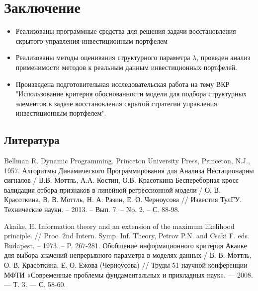 \documentclass[11pt]{beamer}
\begin{document}
\section{Заключение}
\begin{frame}
\begin{itemize}
\item Реализованы программные средства для решения задачи восстановления  скрытого управления инвестиционным портфелем
\item Реализованы методы оценивания структурного параметра $\lambda$, проведен анализ применимости методов к реальным данным инвестиционных портфелей.
\item Произведена подготовительная исследовательская работа на тему ВКР "Использование критерия обоснованности модели для подбора структурных элементов в задаче восстановления скрытой стратегии управления инвестиционным портфелем".
\end{itemize}
\end{frame}


\begin{thebibliography}{100} %
\section{Литература}

\begin{frame}
 Bellman R. Dynamic Programming. Princeton University Press, Princeton, N.J., 1957.
 Алгоритмы Динамического Программирования для Анализа Нестационарны сигналов / В.В. Моттль, А.А. Костин, О.В. Красоткина
 Беспереборная кросс-валидация отбора признаков в линейной регрессионной модели / О. В. Красоткина, В. В. Моттль, Н. А. Разин, Е. О. Черноусова // Известия ТулГУ. Технические науки. – 2013. – Вып. 7. – No. 2. – С. 88-98.
\end{frame}

\begin{frame}
 Akaike, H. Information theory and an extension of the maximum likelihood principle. // Proc. 2nd Intern. Symp. Inf. Theory, Petrov P.N. and Csaki F. eds. Budapest. – 1973. – P. 267-281. 
 Обобщение информационного критерия Акаике для выбора значений непрерывного параметра в моделях данных / В. В. Моттль, О. В. Красоткина, Е. О. Ежова (Черноусова) // Труды 51 научной конференции МФТИ «Современные проблемы фундаментальных и прикладных наук». — 2008. — Т. 3. — С. 58-60.
\end{frame}


\end{thebibliography}
\end{document}
